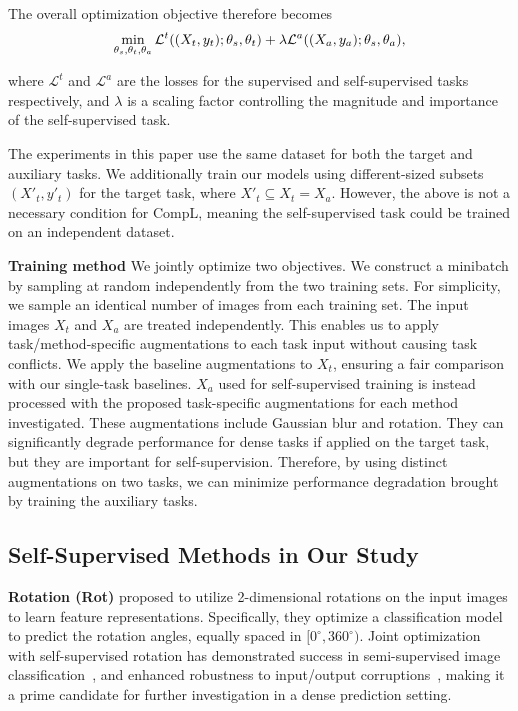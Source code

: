 \documentclass[10pt,twocolumn,letterpaper]{article}
\newcommand{\parsection}[1]{\vspace{1mm}\noindent\textbf{#1 }}
\begin{document}
The overall optimization objective therefore becomes
\begin{equation}
\vspace{-0.1in}
\min_{\theta_{s}, \theta_{t}, \theta_{a}} \mathcal{L}^{t}((X_t,y_t); \theta_{s}, \theta_{t})
+ \lambda \mathcal{L}^{a}((X_a,y_a); \theta_{s}, \theta_{a}),
\end{equation}

\noindent where $\mathcal{L}^{t}$ and $\mathcal{L}^{a}$ are the losses for the supervised and self-supervised tasks respectively, and $\lambda$ is a scaling factor controlling the magnitude and importance of the self-supervised task.

The experiments in this paper use the same dataset for both the target and auxiliary tasks. 
We additionally train our models using different-sized subsets $(X'_t, y'_t)$ for the target task, where $X'_t \subseteq X_t = X_a$.
However, the above is not a necessary condition for CompL, meaning the self-supervised task could be trained on an independent dataset.

\parsection{Training method}
We jointly optimize two objectives. 
We construct a minibatch by sampling at random independently from the two training sets. 
For simplicity, we sample an identical number of images from each training set. 
The input images $X_t$ and $X_a$ are treated independently.
This enables us to apply task/method-specific augmentations to each task input without causing task conflicts. We apply the baseline augmentations to $X_t$, ensuring a fair comparison with our single-task baselines. 
$X_a$ used for self-supervised training is instead processed with the proposed task-specific augmentations for each method investigated.
These augmentations include Gaussian blur and rotation. 
They can significantly degrade performance for dense tasks if applied on the target task, but they are important for self-supervision.
Therefore, by using distinct augmentations on two tasks, we can minimize performance degradation brought by training the auxiliary tasks.

\subsection{Self-Supervised Methods in Our Study}
\label{ss_methods}

\parsection{Rotation (Rot)} 
\cite{gidaris2018unsupervised} proposed to utilize 2-dimensional rotations on the input images to learn feature representations. 
Specifically, they optimize a classification model to predict the rotation angles, equally spaced in $[0^{\circ},360^{\circ} )$. 
Joint optimization with self-supervised rotation has demonstrated success in semi-supervised image classification~\cite{gidaris2019boosting,zhai2019s4l}, and enhanced robustness to input/output corruptions~\cite{hendrycks2019using}, making it a prime candidate for further investigation in a dense prediction setting.
\end{document}
